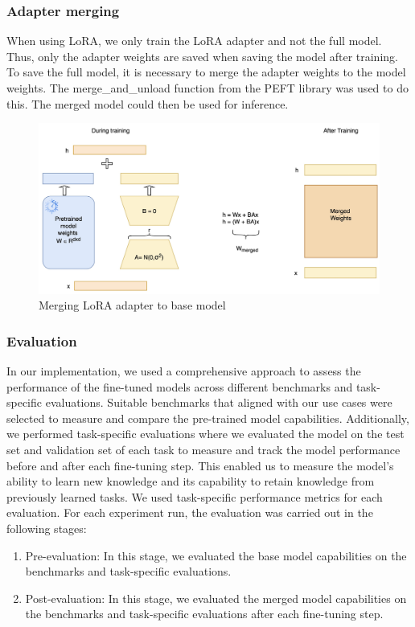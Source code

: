 \subsubsection{Adapter merging} \label{AdapterMerging}
When using LoRA, we only train the LoRA adapter and not the full model. Thus, only the adapter weights are saved when saving the model after training. To save the full model, it is necessary to merge the adapter weights to the model weights. The merge\_and\_unload function from the PEFT library was used to do this. The merged model could then be used for inference.
\begin{figure}[h!]
    \centering
    \includegraphics[width=1\textwidth]{Figures/methodology/adapter_merging.jpeg} 
    \caption{Merging LoRA adapter to base model}
    \label{fig:AdapterMerging}
\end{figure}

\subsubsection{Evaluation}
In our implementation, we used a comprehensive approach to assess the performance of the fine-tuned models across different benchmarks and task-specific evaluations. Suitable benchmarks that aligned with our use cases were selected to measure and compare the pre-trained model capabilities. Additionally, we performed task-specific evaluations where we evaluated the model on the test set and validation set of each task to measure and track the model performance before and after each fine-tuning step. This enabled us to measure the model’s ability to learn new knowledge and its capability to retain knowledge from previously learned tasks. We used task-specific performance metrics for each evaluation.
For each experiment run, the evaluation was carried out in the following stages:
\begin{enumerate}
\item Pre-evaluation: In this stage, we evaluated the base model capabilities on the benchmarks and task-specific evaluations.
\item Post-evaluation: In this stage, we evaluated the merged model capabilities on the benchmarks and task-specific evaluations after each fine-tuning step.
\end{enumerate}

